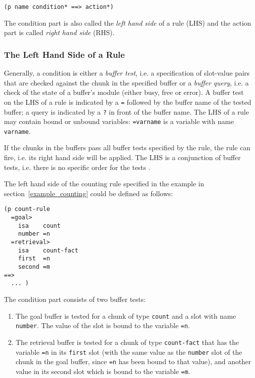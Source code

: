 \begin{lstlisting}
(p name condition* ==> action*)
\end{lstlisting}

The condition part is also called the \emph{left hand side} of a rule (LHS) and the action part is called \emph{right hand side} (RHS).

\subsubsection{The Left Hand Side of a Rule}

Generally, a condition is either a \emph{buffer test}, i.e. a specification of slot-value pairs that are checked against the chunk in the specified buffer or a \emph{buffer query}, i.e. a check of the state of a buffer's module (either busy, free or error). A buffer test on the LHS of a rule is indicated by a \lstinline|=| followed by the buffer name of the tested buffer; a query is indicated by a \lstinline|?| in front of the buffer name. The LHS of a rule may contain bound or unbound variables: \lstinline|=varname| is a variable with name \lstinline|varname|.

If the chunks in the buffers pass all buffer tests specified by the rule, the rule can fire, i.e. its right hand side will be applied. The LHS is a conjunction of buffer tests, i.e. there is no specific order for the tests \cite[p. 165]{actr_reference}.

\begin{example}
The left hand side of the counting rule specified in the example in section~\ref{example_counting} could be defined as follows:

\begin{lstlisting}
(p count-rule
  =goal> 
    isa    count
    number =n
  =retrieval>
    isa    count-fact
    first  =n
    second =m
==>
  ... )
\end{lstlisting}

\enlargethispage{-\baselineskip}

The condition part consists of two buffer tests:

\begin{enumerate}
 \item The goal buffer is tested for a chunk of type \lstinline|count| and a slot with name \lstinline|number|. The value of the slot is bound to the variable \lstinline|=n|.
 \item The retrieval buffer is tested for a chunk of type \lstinline|count-fact| that has the variable \lstinline|=n| in its \lstinline|first| slot (with the same value as the \lstinline|number| slot of the chunk in the goal buffer, since \lstinline|=n| has been bound to that value), and another value in its second slot which is bound to the variable \lstinline|=m|.
\end{enumerate}
\end{example}

